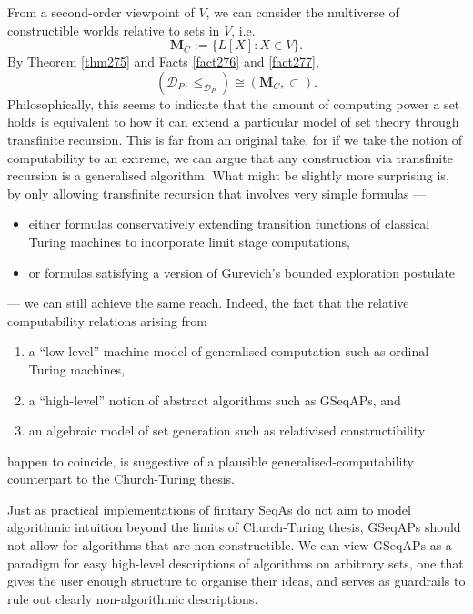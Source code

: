 \documentclass[12pt]{article}
\numberwithin{equation}{section}
\begin{document}
From a second-order viewpoint of $V$, we can consider the multiverse of constructible worlds relative to sets in $V$, i.e.
\begin{equation*}
    \mathbf{M}_C := \{L[X] : X \in V\} \text{.}
\end{equation*}
By Theorem \ref{thm275} and Facts \ref{fact276} and \ref{fact277}, 
\begin{equation*}
    (\mathcal{D}_P, \leq_{\mathcal{D}_P}) \cong (\mathbf{M}_C, \subset) \text{.}
\end{equation*}
Philosophically, this seems to indicate that the amount of computing power a set holds is equivalent to how it can extend a particular model of set theory through transfinite recursion. This is far from an original take, for if we take the notion of computability to an extreme, we can argue that any construction via transfinite recursion is a generalised algorithm. What might be slightly more surprising is, by only allowing transfinite recursion that involves very simple formulas ---
\begin{itemize}
    \item either formulas conservatively extending transition functions of classical Turing machines to incorporate limit stage computations,
    \item or formulas satisfying a version of Gurevich's bounded exploration postulate
\end{itemize}
--- we can still achieve the same reach. Indeed, the fact that the relative computability relations arising from
\begin{enumerate}[label=(GCT\arabic*), leftmargin=50pt]
    \item a ``low-level'' machine model of generalised computation such as ordinal Turing machines, 
    \item a ``high-level'' notion of abstract algorithms such as GSeqAPs, and
    \item an algebraic model of set generation such as relativised constructibility
\end{enumerate}
happen to coincide, is suggestive of a plausible generalised-computability counterpart to the Church-Turing thesis.

Just as practical implementations of finitary SeqAs do not aim to model algorithmic intuition beyond the limits of Church-Turing thesis, GSeqAPs should not allow for algorithms that are non-constructible. We can view GSeqAPs as a paradigm for easy high-level descriptions of algorithms on arbitrary sets, one that gives the user enough structure to organise their ideas, and serves as guardrails to rule out clearly non-algorithmic descriptions.
\end{document}
